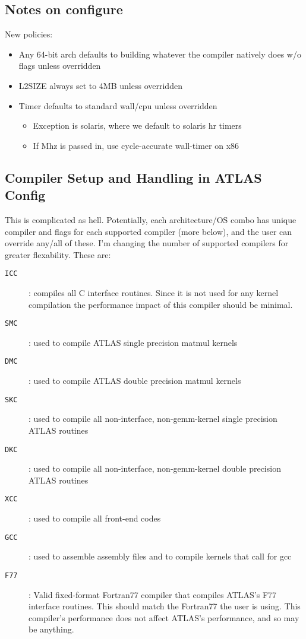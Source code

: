 \documentclass[11pt]{article}
\begin{document}
\subsection{Notes on configure}
New policies:
\begin{itemize}
\item Any 64-bit arch defaults to building whatever the compiler natively does
      w/o flags unless overridden
\item L2SIZE always set to 4MB unless overridden
\item Timer defaults to standard wall/cpu unless overridden
   \begin{itemize}
   \item Exception is solaris, where we default to solaris hr timers
   \item If Mhz is passed in, use cycle-accurate wall-timer on x86
   \end{itemize}
\end{itemize}

\subsection{Compiler Setup and Handling in ATLAS Config}
\label{sec-compProbe}

This is complicated as hell.  Potentially, each architecture/OS combo has
unique compiler and flags for each supported compiler (more below), and the 
user can override any/all of these.  I'm changing the number of supported
compilers for greater flexability.  These are:
\begin{description}
\item [{\tt ICC}] : compiles all C interface routines.
      Since it is not used for any kernel compilation
      the performance impact of this compiler should be minimal.
\item [{\tt SMC}] : used to compile ATLAS single precision matmul kernels
\item [{\tt DMC}] : used to compile ATLAS double precision matmul kernels
\item [{\tt SKC}] : used to compile all non-interface, non-gemm-kernel
                    single precision ATLAS routines
\item [{\tt DKC}] : used to compile all non-interface, non-gemm-kernel
                    double precision ATLAS routines
\item [{\tt XCC}] : used to compile all front-end codes
\item [{\tt GCC}] : used to assemble assembly files and to compile kernels
                    that call for gcc
\item [{\tt F77}] : Valid fixed-format Fortran77 compiler that compiles
      ATLAS's F77 interface routines.  This should match the Fortran77
      the user is using.  This compiler's performance
      does not affect ATLAS's performance, and so may be anything.
\end{description}
\end{document}
